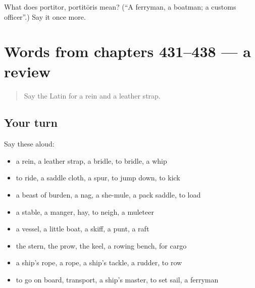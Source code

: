 \begin{tcolorbox}[breakable,colback=teal!4,colframe=teal!35!black,title={Before you move on}]
What does portitor, portitōris mean? (\textquotedblleft{}A ferryman, a boatman; a customs officer\textquotedblright{}.) Say it once more.
\end{tcolorbox}
\section[(dialogue)]{Words from chapters 431–438 — a review}

\label{lesson:LA-R438-review-431-438}



\begin{quote}
Say the Latin for a rein and a leather strap.
\end{quote}

\subsection*{Your turn}
Say these aloud:

\begin{itemize}
\raggedright
  \item a rein, a leather strap, a bridle, to bridle, a whip
  \item to ride, a saddle cloth, a spur, to jump down, to kick
  \item a beast of burden, a nag, a she-mule, a pack saddle, to load
  \item a stable, a manger, hay, to neigh, a muleteer
  \item a vessel, a little boat, a skiff, a punt, a raft
  \item the stern, the prow, the keel, a rowing bench, for cargo
  \item a ship's rope, a rope, a ship's tackle, a rudder, to row
  \item to go on board, transport, a ship's master, to set sail, a ferryman
\end{itemize}

